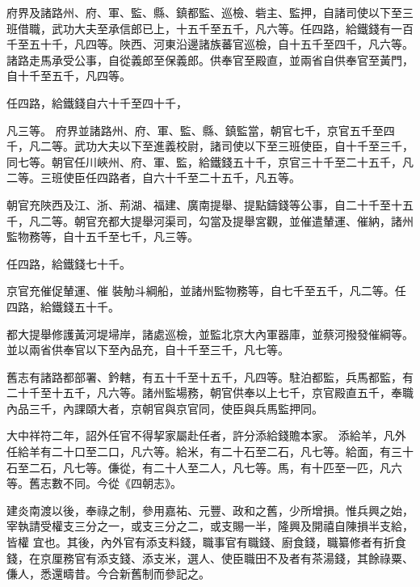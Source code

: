 \begin{pinyinscope}
 府界及諸路州、府、軍、監、縣、鎮都監、巡檢、砦主、監押，自諸司使以下至三班借職，武功大夫至承信郎已上，十五千至五千，凡六等。任四路，給鐵錢有一百千至五十千，凡四等。陜西、河東沿邊諸族蕃官巡檢，自十五千至四千，凡六等。諸路走馬承受公事，自從義郎至保義郎。供奉官至殿直，並兩省自供奉官至黃門，自十千至五千，凡四等。



 任四路，給鐵錢自六十千至四十千，



 凡三等。
 府界並諸路州、府、軍、監、縣、鎮監當，朝官七千，京官五千至四千，凡二等。武功大夫以下至進義校尉，諸司使以下至三班使臣，自十千至三千，同七等。朝官任川峽州、府、軍、監，給鐵錢五十千，京官三十千至二十五千，凡二等。三班使臣任四路者，自六十千至二十五千，凡五等。



 朝官充陜西及江、浙、荊湖、福建、廣南提舉、提點鑄錢等公事，自二十千至十五千，凡二等。朝官充都大提舉河渠司，勾當及提舉宮觀，並催遣輦運、催納，諸州監物務等，自十五千至七千，凡三等。



 任四路，給鐵錢七十千。



 京官充催促輦運、催
 裝觔斗綱船，並諸州監物務等，自七千至五千，凡二等。任四路，給鐵錢五十千。



 都大提舉修護黃河堤埽岸，諸處巡檢，並監北京大內軍器庫，並蔡河撥發催綱等。並以兩省供奉官以下至內品充，自十千至三千，凡七等。



 舊志有諸路都部署、鈐轄，有五十千至十五千，凡四等。駐泊都監，兵馬都監，有二十千至十五千，凡六等。諸州監場務，朝官供奉以上七千，京官殿直五千，奉職內品三千，內課頤大者，京朝官與京官同，使臣與兵馬監押同。



 大中祥符二年，詔外任官不得挈家屬赴任者，許分添給錢贍本家。
 添給羊，凡外任給羊有二十口至二口，凡六等。給米，有二十石至二石，凡七等。給面，有三十石至二石，凡七等。傔從，有二十人至二人，凡七等。馬，有十匹至一匹，凡六等。舊志數不同。今從《四朝志》。



 建炎南渡以後，奉祿之制，參用嘉祐、元豐、政和之舊，少所增損。惟兵興之始，宰執請受權支三分之一，或支三分之二，或支賜一半，隆興及開禧自陳損半支給，皆權
 宜也。其後，內外官有添支料錢，職事官有職錢、廚食錢，職纂修者有折食錢，在京厘務官有添支錢、添支米，選人、使臣職田不及者有茶湯錢，其餘祿粟、傔人，悉還疇昔。今合新舊制而參記之。




\end{pinyinscope}
